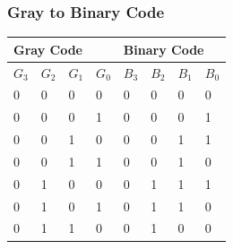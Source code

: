 \documentclass[11pt]{article}
\begin{document}
\subsubsection{Gray to Binary Code}
\begin{table}[H]
	\begin{tabular}{|llll||llll|}
		\hline
		\multicolumn{4}{|l|}{\textbf{Gray Code}} & \multicolumn{4}{l|}{\textbf{Binary Code}}
		\\ \hline
		\multicolumn{1}{|l|}{$G_3$}              & \multicolumn{1}{l|}{$G_2$}                & \multicolumn{1}{l|}{$G_1$} & $G_0$ & \multicolumn{1}{l|}{$B_3$} & \multicolumn{1}{l|}{$B_2$} & \multicolumn{1}{l|}{$B_1$} & $B_0$ \\ \hline
		\multicolumn{1}{|l|}{0}                  & \multicolumn{1}{l|}{0}                    & \multicolumn{1}{l|}{0}     & 0     & \multicolumn{1}{l|}{0}     & \multicolumn{1}{l|}{0}     & \multicolumn{1}{l|}{0}     & 0     \\ \hline
		\multicolumn{1}{|l|}{0}                  & \multicolumn{1}{l|}{0}                    & \multicolumn{1}{l|}{0}     & 1     & \multicolumn{1}{l|}{0}     & \multicolumn{1}{l|}{0}     & \multicolumn{1}{l|}{0}     & 1     \\ \hline
		\multicolumn{1}{|l|}{0}                  & \multicolumn{1}{l|}{0}                    & \multicolumn{1}{l|}{1}     & 0     & \multicolumn{1}{l|}{0}     & \multicolumn{1}{l|}{0}     & \multicolumn{1}{l|}{1}     & 1     \\ \hline
		\multicolumn{1}{|l|}{0}                  & \multicolumn{1}{l|}{0}                    & \multicolumn{1}{l|}{1}     & 1     & \multicolumn{1}{l|}{0}     & \multicolumn{1}{l|}{0}     & \multicolumn{1}{l|}{1}     & 0     \\ \hline
		\multicolumn{1}{|l|}{0}                  & \multicolumn{1}{l|}{1}                    & \multicolumn{1}{l|}{0}     & 0     & \multicolumn{1}{l|}{0}     & \multicolumn{1}{l|}{1}     & \multicolumn{1}{l|}{1}     & 1     \\ \hline
		\multicolumn{1}{|l|}{0}                  & \multicolumn{1}{l|}{1}                    & \multicolumn{1}{l|}{0}     & 1     & \multicolumn{1}{l|}{0}     & \multicolumn{1}{l|}{1}     & \multicolumn{1}{l|}{1}     & 0     \\ \hline
		\multicolumn{1}{|l|}{0}                  & \multicolumn{1}{l|}{1}                    & \multicolumn{1}{l|}{1}     & 0     & \multicolumn{1}{l|}{0}     & \multicolumn{1}{l|}{1}     & \multicolumn{1}{l|}{0}     & 0     \\ \hline

\end{tabular}
\end{table}
\end{document}
